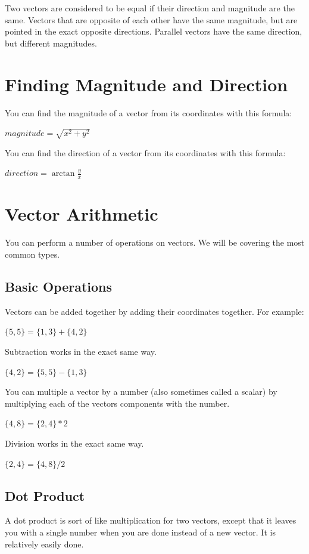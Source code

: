 \documentclass[]{book}
\begin{document}
Two vectors are considered to be equal if their direction and magnitude are
the same.  Vectors that are opposite of each other have the same magnitude,
but are pointed in the exact opposite directions.  Parallel vectors have
the same direction, but different magnitudes.

\section{Finding Magnitude and Direction}

You can find the magnitude of a vector from its coordinates with this
formula:

\bigskip
$magnitude = \sqrt{x^2+y^2} $
\bigskip

You can find the direction of a vector from its coordinates with this
formula:

\bigskip
$direction = \arctan{\frac{y}{x}} $
\bigskip

\section{Vector Arithmetic}

You can perform a number of operations on vectors. We will be covering the
most common types.

\subsection{Basic Operations}

Vectors can be added together by adding their coordinates together.  For
example:

\bigskip
$\{5,5\} = \{1,3\} + \{4,2\}$
\bigskip

Subtraction works in the exact same way.

\bigskip
$\{4,2\} = \{5,5\} - \{1,3\}$
\bigskip

You can multiple a vector by a number (also sometimes called a scalar) by
multiplying each of the vectors components with the number.

\bigskip
$\{4,8\} = \{2,4\} * 2$
\bigskip

Division works in the exact same way.

\bigskip
$\{2,4\} = \{4,8\} / 2$
\bigskip

\subsection{Dot Product}
A dot product is sort of like multiplication for two vectors, except that
it leaves you with a single number when you are done instead of a new
vector. It is relatively easily done.
\end{document}
